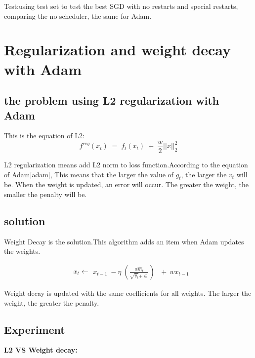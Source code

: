 \documentclass{article}
\begin{document}
Test:using test set to test the best SGD with no restarts and special restarts, comparing the no scheduler, the same for Adam.




\section{Regularization and weight decay with Adam}

\subsection{the problem using L2 regularization with Adam}

This is the equation of L2:
\begin{equation}
f^{reg}(x_t)\;=\;f_t(x_t)\;+\;\frac w2\vert\vert x\vert\vert_2^2
\end{equation}

L2 regularization means add L2 norm to loss function.According to the equation of Adam\ref{adam}, This means that the larger the value of $ g_t$, the larger the $v_t$ will be. When the weight is updated, an error will occur. The greater the weight, the smaller the penalty will be.


\subsection{solution}

Weight Decay is the solution.This algorithm adds an item when Adam updates the weights.

\begin{equation}
\begin{array}{l}\begin{array}{l}x_t\leftarrow\end{array}x_{t-1}\;-\eta\;\left(\frac{\alpha{\widehat m}_t}{\sqrt{{\widehat v}_t}+\in}\right)\end{array}\;+\:wx_{t-1}
\end{equation}

Weight decay is updated with the same coefficients for all weights. The larger the weight, the greater the penalty.


\subsection{Experiment}


\textbf{L2 VS Weight decay:}
\end{document}
